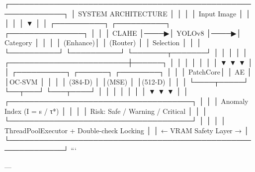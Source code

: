 \documentclass[12pt,a4paper,oneside]{report}
\begin{document}
┌─────────────────────────────────────────────────────────────┐
│                    SYSTEM ARCHITECTURE                       │
│                                                              │
│  Input Image                                                 │
│      │                                                       │
│      ▼                                                       │
│  ┌──────────┐     ┌──────────┐     ┌───────────────┐       │
│  │  CLAHE   │────▶│ YOLOv8   │────▶│ Category      │       │
│  │ (Enhance)│     │ (Router) │     │ Selection     │       │
│  └──────────┘     └──────────┘     └───────┬───────┘       │
│                                             │                │
│                    ┌────────────────────────┼──────┐        │
│                    │                        │      │        │
│                    ▼                        ▼      ▼        │
│              ┌──────────┐           ┌──────┐ ┌────────┐    │
│              │ PatchCore│           │  AE  │ │OC-SVM  │    │
│              │ (384-D)  │           │(MSE) │ │(512-D) │    │
│              └────┬─────┘           └──┬───┘ └───┬────┘    │
│                   │                    │         │          │
│                   ▼                    ▼         ▼          │
│              ┌─────────────────────────────────────┐       │
│              │   Anomaly Index (I = s / τ*)        │       │
│              │   Risk: Safe / Warning / Critical    │       │
│              └─────────────────────────────────────┘       │
│                                                              │
│  ThreadPoolExecutor + Double-check Locking                   │
│  ← VRAM Safety Layer →                                       │
└─────────────────────────────────────────────────────────────┘
```

---
\end{document}
